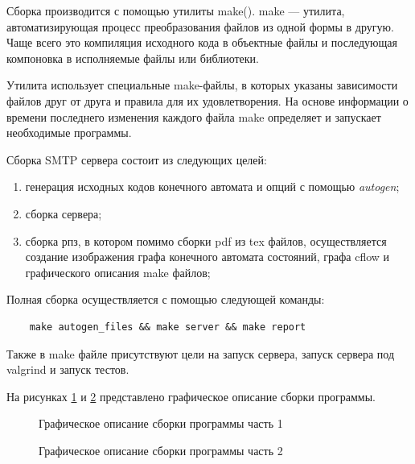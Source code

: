 \documentclass[a4paper,12pt]{report}
\begin{document}
Сборка производится с помощью утилиты make(\cite{make}). make — утилита, автоматизирующая процесс преобразования файлов из одной формы в другую. Чаще всего это компиляция исходного кода в объектные файлы и последующая компоновка в исполняемые файлы или библиотеки.

Утилита использует специальные make-файлы, в которых указаны зависимости файлов друг от друга и правила для их удовлетворения. На основе информации о времени последнего изменения каждого файла make определяет и запускает необходимые программы.

Сборка SMTP сервера состоит из следующих целей:

\begin{enumerate}
	\item генерация исходных кодов конечного автомата и опций с помощью \textit{autogen};
    \item сборка сервера;
    \item сборка рпз, в котором помимо сборки pdf из tex файлов, осуществляется создание изображения графа конечного автомата состояний, графа cflow и графического описания make файлов;
    
\end{enumerate}



Полная сборка осуществляется с помощью следующей команды:
\begin{verbatim}
    make autogen_files && make server && make report
\end{verbatim}

Также в make файле присутствуют цели на запуск сервера, запуск сервера под valgrind и запуск тестов.

На рисунках \ref{ris:mkflow_first} 
и 
\ref{ris:mkflow_second} 
представлено графическое описание сборки программы.

\begin{figure}[h!]
\caption{Графическое описание сборки программы часть 1}
\label{ris:mkflow_first}
\end{figure}

\begin{figure}[h!]
\caption{Графическое описание сборки программы часть 2}
\label{ris:mkflow_second}
\end{figure}
\end{document}
